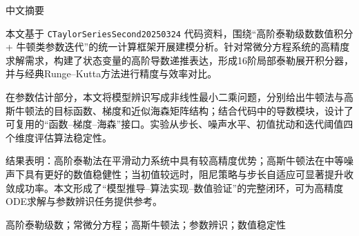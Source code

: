 \thispagestyle{plain}
{}
\centerline{\heiti 中文摘要}

\linespread{1.4}\bigskip

本文基于 \texttt{CTaylorSeriesSecond20250324} 代码资料，围绕“高阶泰勒级数数值积分 + 牛顿类参数迭代”的统一计算框架开展建模分析。针对常微分方程系统的高精度求解需求，构建了状态变量的高阶导数递推表达，形成16阶局部泰勒展开积分器，并与经典Runge--Kutta方法进行精度与效率对比。

在参数估计部分，本文将模型辨识写成非线性最小二乘问题，分别给出牛顿法与高斯牛顿法的目标函数、梯度和近似海森矩阵结构；结合代码中的导数模块，设计了可复用的“函数--梯度--海森”接口。实验从步长、噪声水平、初值扰动和迭代阈值四个维度评估算法稳定性。

结果表明：高阶泰勒法在平滑动力系统中具有较高精度优势；高斯牛顿法在中等噪声下具有更好的数值稳健性；当初值较远时，阻尼策略与步长自适应可显著提升收敛成功率。本文形成了“模型推导--算法实现--数值验证”的完整闭环，可为高精度ODE求解与参数辨识任务提供参考。

\bigskip
{}
高阶泰勒级数；常微分方程；高斯牛顿法；参数辨识；数值稳定性
